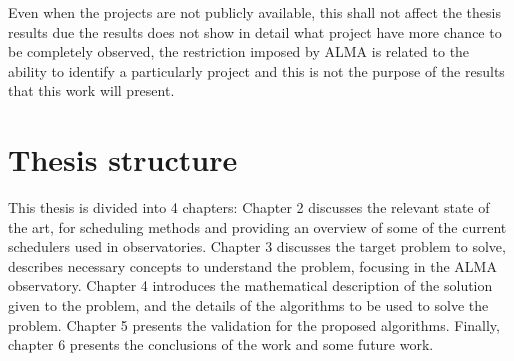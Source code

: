 Even when the projects are not publicly available, this shall not affect the thesis results due the
results does not show in detail what project have more chance to be completely observed, the
restriction imposed by ALMA is related to the ability to identify a particularly project and this is
not the purpose of the results that this work will present.

\section{Thesis structure}
This thesis is divided into 4 chapters: Chapter 2 discusses the relevant state of the art, for scheduling methods and providing an overview of some of the current schedulers used in observatories. Chapter 3 discusses the target problem to solve, describes necessary concepts to understand the problem, focusing in the ALMA observatory. Chapter 4 introduces the mathematical description of the solution given to the problem, and the details of the algorithms to be used to solve the problem. Chapter 5 presents the validation for the proposed algorithms. Finally, chapter 6 presents the conclusions of the work and some future work.